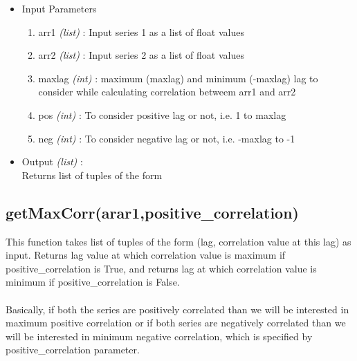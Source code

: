 \begin{itemize}
 \item Input Parameters
 
 \begin{enumerate}
  \item arr1 \textit{(list)} : Input series 1 as a list of float values
  \item arr2 \textit{(list)} : Input series 2 as a list of float values
  \item maxlag \textit{(int)} : maximum (maxlag) and minimum (-maxlag) lag to 
consider while calculating correlation betweem arr1 and arr2
  \item pos \textit{(int)} : To consider positive lag or not, i.e. 1 to maxlag
  \item neg \textit{(int)} : To consider negative lag or not, i.e. -maxlag to -1
 \end{enumerate}

 \item Output \textit{(list)} : \\
  Returns list of tuples of the form \\
 
\end{itemize}

\subsection{getMaxCorr(arar1,positive\_correlation)}

This function takes list of tuples of the form (lag, correlation value at this 
lag) as  input. Returns lag value at which correlation value is maximum if 
positive\_correlation is True, and returns lag at which correlation value is 
minimum if positive\_correlation is False. \\
\\
Basically, if both the series are positively correlated than we will be 
interested in maximum positive correlation or if both series are negatively 
correlated than we will be interested in minimum negative correlation, which is 
specified by positive\_correlation parameter.

